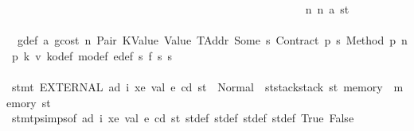 \begin{isabellebody}
\ \ \ \ \ \ \ \ \ \ \ \ \ \ \ \ \ \ \ \ \ \ \ \ \ \ \ \ \ \ \ \ \ \ \ \ \ \ \ \ \ \ \ \ \ \ \ \ \ \ \ \ \isamarkupfalse%
\ n{}{\isacharcolon}{\kern0pt}\ {\isacharparenleft}{\kern0pt}n\ a\ st{\isacharprime}{\kern0pt}{\isacharprime}{\kern0pt}{\isacharprime}{\kern0pt}{\isacharprime}{\kern0pt}{\isacharprime}{\kern0pt}{\isacharparenright}{\kern0pt}\isanewline
\ \ \ \ \ \ \ \ \ \ \ \ \ \ \ \ \ \ \ \ \ \ \ \ \ \ \ \ \ \ \ \ \ \ \ \ \ \ \ \ \ \ \ \ \ \ \ \ \ \ \ \ \isamarkupfalse%
\ {}{\isacharparenleft}{\kern0pt}{}{\isacharparenright}{\kern0pt}\ g{\isacharunderscore}{\kern0pt}def\ a{}\ gcost\ n\ Pair\ KValue\ Value\ TAddr\ Some\ s{}\ Contract\ p{}\ s{}\ Method\ p{}\ n{}\ p{}\ k{}\ v\ k\isactrlsub o{\isacharunderscore}{\kern0pt}def\ m\isactrlsub o{\isacharunderscore}{\kern0pt}def\ e{\isacharprime}{\kern0pt}{\isacharunderscore}{\kern0pt}def\ s{}\ f{}\ s{}\ s{}\isanewline
\ \ \ \ \ \ \ \ \ \ \ \ \ \ \ \ \ \ \ \ \ \ \ \ \ \ \ \ \ \ \ \ \ \ \ \ \ \ \ \ \ \ \ \ \ \ \ \ \ \ \ \ \isamarkupfalse%
\ {\isachardoublequoteopen}stmt\ {\isacharparenleft}{\kern0pt}EXTERNAL\ ad\ i\ xe\ val{\isacharparenright}{\kern0pt}\ e\ cd\ st\ {\isacharequal}{\kern0pt}\ Normal\ {\isacharparenleft}{\kern0pt}{\isacharparenleft}{\kern0pt}{\isacharparenright}{\kern0pt}{\isacharcomma}{\kern0pt}\ st{\isacharprime}{\kern0pt}{\isacharprime}{\kern0pt}{\isacharprime}{\kern0pt}{\isacharprime}{\kern0pt}{\isacharprime}{\kern0pt}{\isasymlparr}stack{\isacharcolon}{\kern0pt}{\isacharequal}{\kern0pt}stack\ st{\isacharprime}{\kern0pt}{\isacharprime}{\kern0pt}{\isacharprime}{\kern0pt}{\isacharprime}{\kern0pt}{\isacharcomma}{\kern0pt}\ memory\ {\isacharcolon}{\kern0pt}{\isacharequal}{\kern0pt}\ memory\ st{\isacharprime}{\kern0pt}{\isacharprime}{\kern0pt}{\isacharprime}{\kern0pt}{\isacharprime}{\kern0pt}{\isasymrparr}{\isacharparenright}{\kern0pt}{\isachardoublequoteclose}\isanewline
\ \ \ \ \ \ \ \ \ \ \ \ \ \ \ \ \ \ \ \ \ \ \ \ \ \ \ \ \ \ \ \ \ \ \ \ \ \ \ \ \ \ \ \ \ \ \ \ \ \ \ \ \ \ \isamarkupfalse%
\ stmt{\isachardot}{\kern0pt}psimps{\isacharparenleft}{\kern0pt}{}{\isacharparenright}{\kern0pt}{\isacharbrackleft}{\kern0pt}of\ ad\ i\ xe\ val\ e\ cd\ st{\isacharbrackright}{\kern0pt}\ st{\isacharprime}{\kern0pt}{\isacharunderscore}{\kern0pt}def\ st{\isacharprime}{\kern0pt}{\isacharprime}{\kern0pt}{\isacharunderscore}{\kern0pt}def\ st{\isacharprime}{\kern0pt}{\isacharprime}{\kern0pt}{\isacharprime}{\kern0pt}{\isacharunderscore}{\kern0pt}def\ st{\isacharprime}{\kern0pt}{\isacharprime}{\kern0pt}{\isacharprime}{\kern0pt}{\isacharprime}{\kern0pt}{\isacharunderscore}{\kern0pt}def\ True\ False\ \isamarkupfalse%

\end{isabellebody}
